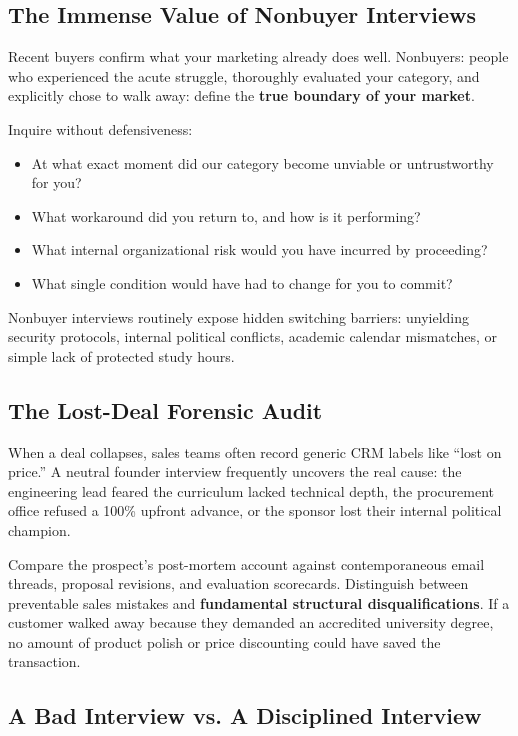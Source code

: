 \subsection{The Immense Value of Nonbuyer Interviews}

Recent buyers confirm what your marketing already does well. Nonbuyers: people who experienced the acute struggle, thoroughly evaluated your category, and explicitly chose to walk away: define the \textbf{true boundary of your market}.

Inquire without defensiveness:
\begin{itemize}[leftmargin=1.2em,itemsep=0.2ex]
  \item At what exact moment did our category become unviable or untrustworthy for you?
  \item What workaround did you return to, and how is it performing?
  \item What internal organizational risk would you have incurred by proceeding?
  \item What single condition would have had to change for you to commit?
\end{itemize}
Nonbuyer interviews routinely expose hidden switching barriers: unyielding security protocols, internal political conflicts, academic calendar mismatches, or simple lack of protected study hours.

\subsection{The Lost-Deal Forensic Audit}

When a deal collapses, sales teams often record generic CRM labels like ``lost on price.'' A neutral founder interview frequently uncovers the real cause: the engineering lead feared the curriculum lacked technical depth, the procurement office refused a 100\% upfront advance, or the sponsor lost their internal political champion.

Compare the prospect's post-mortem account against contemporaneous email threads, proposal revisions, and evaluation scorecards. Distinguish between preventable sales mistakes and \textbf{fundamental structural disqualifications}. If a customer walked away because they demanded an accredited university degree, no amount of product polish or price discounting could have saved the transaction.

\subsection{A Bad Interview vs. A Disciplined Interview}

